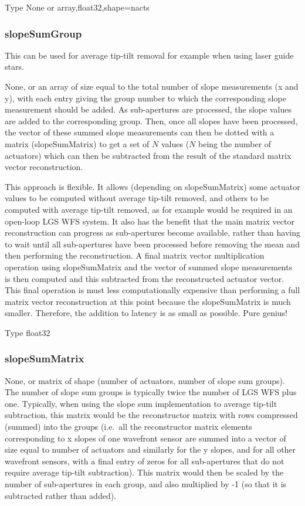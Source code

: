\documentclass[a4,10pt]{article}
\begin{document}
Type None or array,float32,shape=nacts

\subsubsection{slopeSumGroup}
This can be used for average tip-tilt removal for example when using
laser guide stars.

None, or an array of size equal to the total number of slope
measurements (x and y), with each entry giving the group number to
which the corresponding slope measurement should be added.  As
sub-apertures are processed, the slope values are added to the
corresponding group.  Then, once all slopes have been processed, the
vector of these summed slope measurements can then be dotted with a
matrix (slopeSumMatrix) to get a set of $N$ values ($N$ being the
number of actuators) which can then be subtracted from the result of
the standard matrix vector reconstruction.

This approach is flexible.  It allows (depending on slopeSumMatrix)
some actuator values to be computed without average tip-tilt removed,
and others to be computed with average tip-tilt removed, as for
example would be required in an open-loop LGS WFS system.  It also has
the benefit that the main matrix vector reconstruction can progress as
sub-apertures become available, rather than having to wait until all
sub-apertures have been processed before removing the mean and then
performing the reconstruction.  A final matrix vector multiplication
operation using slopeSumMatrix and the vector of summed slope
measurements is then computed and this subtracted from the
reconstructed actuator vector.  This final operation is must less
computationally expensive than performing a full matrix vector
reconstruction at this point because the slopeSumMatrix is much
smaller.  Therefore, the addition to latency is as small as possible.
Pure genius!

Type float32

\subsubsection{slopeSumMatrix}
None, or matrix of shape (number of actuators, number of slope sum
groups).  The number of slope sum groups is typically twice the number
of LGS WFS plus one.  Typically, when using the slope sum
implementation to average tip-tilt subtraction, this matrix would be
the reconstructor matrix with rows compressed (summed) into the groups
(i.e.\ all the reconstructor matrix elements corresponding to x slopes
of one wavefront sensor are summed into a vector of size equal to
number of actuators and similarly for the y slopes, and for all other
wavefront sensors, with a final entry of zeros for all sub-apertures
that do not require average tip-tilt subtraction).  This matrix would
then be scaled by the number of sub-apertures in each group, and also
multiplied by -1 (so that it is subtracted rather than added).
\end{document}
